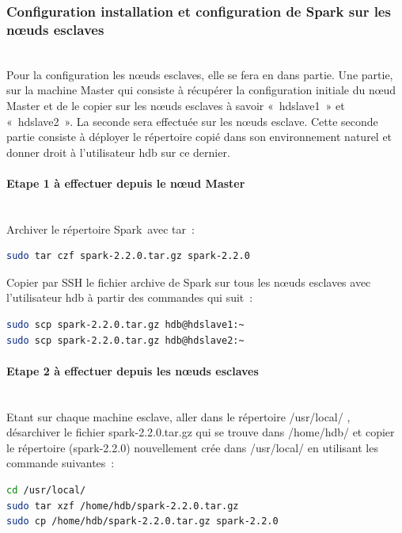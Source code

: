 \documentclass[12pt,english]{book}
\begin{document}
\subsubsection{Configuration installation et configuration de Spark sur les nœuds esclaves}\mbox{}\\

Pour la configuration les nœuds esclaves, elle se fera en dans partie.
Une partie, sur la machine Master qui consiste à récupérer la configuration initiale du nœud Master et de le copier sur les nœuds esclaves à savoir « hdslave1 » et « hdslave2 ».
La seconde sera effectuée sur les nœuds esclave. Cette seconde partie consiste à déployer le répertoire copié dans son environnement naturel et donner droit à l’utilisateur hdb sur ce dernier. 

\paragraph{Etape 1 à effectuer depuis le nœud Master}\mbox{}\\

Archiver le répertoire Spark avec tar :  

\begin{lstlisting}[language=bash, frame=single]
sudo tar czf spark-2.2.0.tar.gz spark-2.2.0
\end{lstlisting}

Copier par SSH le fichier archive de Spark sur tous les nœuds esclaves avec l’utilisateur hdb à partir des commandes qui suit :

\begin{lstlisting}[language=bash, frame=single]
sudo scp spark-2.2.0.tar.gz hdb@hdslave1:~
sudo scp spark-2.2.0.tar.gz hdb@hdslave2:~
\end{lstlisting}

\paragraph{Etape 2 à effectuer depuis les nœuds esclaves}\mbox{}\\

Etant sur chaque machine esclave, aller dans le répertoire /usr/local/ , désarchiver le fichier  spark-2.2.0.tar.gz qui se trouve dans /home/hdb/ et copier le répertoire (spark-2.2.0) nouvellement crée dans /usr/local/ en utilisant les commande suivantes :

\begin{lstlisting}[language=bash, frame=single]
cd /usr/local/
sudo tar xzf /home/hdb/spark-2.2.0.tar.gz 
sudo cp /home/hdb/spark-2.2.0.tar.gz spark-2.2.0
\end{lstlisting}
\end{document}
